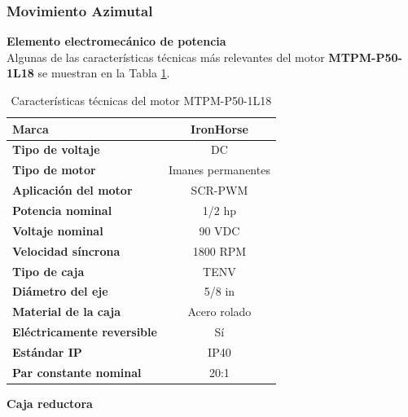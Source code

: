 \subsubsection{Movimiento Azimutal}

\textbf{Elemento electromecánico de potencia}\\
Algunas de las características técnicas más relevantes del motor \textbf{MTPM-P50-1L18} se muestran en la Tabla \ref{tab:motorZ}.

\begin{table}[H]
	\centering
	\caption{Características técnicas del motor MTPM-P50-1L18 \cite{DDA1}}
	\begin{tabular}{|l|p{12.93em}|}
		\hline
		\textbf{Marca} & \multicolumn{1}{c|}{IronHorse} \\
		\hline
		\textbf{Tipo de voltaje} & \multicolumn{1}{c|}{DC} \\
		\hline
		\textbf{Tipo de motor} & \multicolumn{1}{c|}{Imanes permanentes} \\
		\hline
		\textbf{Aplicación del motor} & \multicolumn{1}{c|}{SCR-PWM} \\
		\hline
		\textbf{Potencia nominal} & \multicolumn{1}{c|}{1/2 hp} \\
		\hline
		\textbf{Voltaje nominal} & \multicolumn{1}{c|}{90 VDC} \\
		\hline
		\textbf{Velocidad síncrona} & \multicolumn{1}{c|}{1800 RPM} \\
		\hline
		\textbf{Tipo de caja} & \multicolumn{1}{c|}{TENV} \\
		\hline
		\textbf{Diámetro del eje} & \multicolumn{1}{c|}{5/8 in} \\
		\hline
		\textbf{Material de la caja} & \multicolumn{1}{c|}{Acero rolado} \\
		\hline
		\textbf{Eléctricamente reversible} & \multicolumn{1}{c|}{Sí} \\
		\hline
		\textbf{Estándar IP} & \multicolumn{1}{c|}{IP40} \\
		\hline
		\textbf{Par constante nominal} & \multicolumn{1}{c|}{20:1} \\
		\hline
	\end{tabular}%
	\label{tab:motorZ}%
\end{table}%

\newpage
\textbf{Caja reductora}

